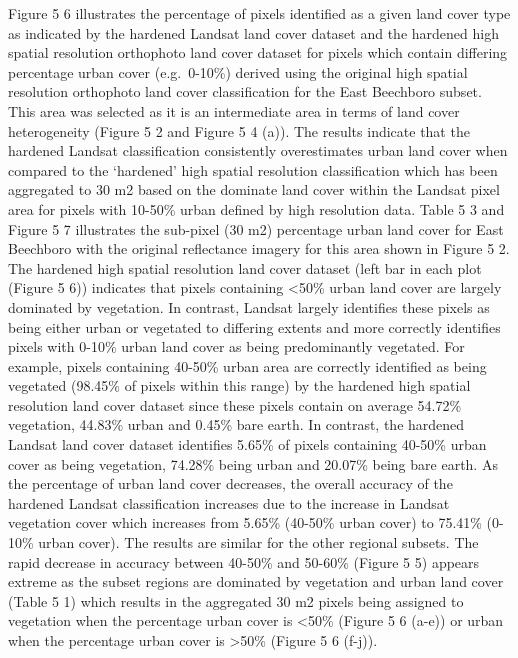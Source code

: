 \documentclass[]{book}
\begin{document}
Figure 5 6 illustrates the percentage of pixels identified as a given
land cover type as indicated by the hardened Landsat land cover dataset
and the hardened high spatial resolution orthophoto land cover dataset
for pixels which contain differing percentage urban cover (e.g.~0-10\%)
derived using the original high spatial resolution orthophoto land cover
classification for the East Beechboro subset. This area was selected as
it is an intermediate area in terms of land cover heterogeneity (Figure
5 2 and Figure 5 4 (a)). The results indicate that the hardened Landsat
classification consistently overestimates urban land cover when compared
to the `hardened' high spatial resolution classification which has been
aggregated to 30 m2 based on the dominate land cover within the Landsat
pixel area for pixels with 10-50\% urban defined by high resolution
data. Table 5 3 and Figure 5 7 illustrates the sub-pixel (30 m2)
percentage urban land cover for East Beechboro with the original
reflectance imagery for this area shown in Figure 5 2. The hardened high
spatial resolution land cover dataset (left bar in each plot (Figure 5
6)) indicates that pixels containing \textless{}50\% urban land cover
are largely dominated by vegetation. In contrast, Landsat largely
identifies these pixels as being either urban or vegetated to differing
extents and more correctly identifies pixels with 0-10\% urban land
cover as being predominantly vegetated. For example, pixels containing
40-50\% urban area are correctly identified as being vegetated (98.45\%
of pixels within this range) by the hardened high spatial resolution
land cover dataset since these pixels contain on average 54.72\%
vegetation, 44.83\% urban and 0.45\% bare earth. In contrast, the
hardened Landsat land cover dataset identifies 5.65\% of pixels
containing 40-50\% urban cover as being vegetation, 74.28\% being urban
and 20.07\% being bare earth. As the percentage of urban land cover
decreases, the overall accuracy of the hardened Landsat classification
increases due to the increase in Landsat vegetation cover which
increases from 5.65\% (40-50\% urban cover) to 75.41\% (0-10\% urban
cover). The results are similar for the other regional subsets. The
rapid decrease in accuracy between 40-50\% and 50-60\% (Figure 5 5)
appears extreme as the subset regions are dominated by vegetation and
urban land cover (Table 5 1) which results in the aggregated 30 m2
pixels being assigned to vegetation when the percentage urban cover is
\textless{}50\% (Figure 5 6 (a-e)) or urban when the percentage urban
cover is \textgreater{}50\% (Figure 5 6 (f-j)).
\end{document}
